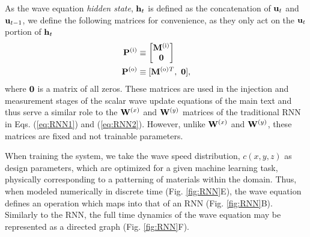 As the wave equation \textit{hidden state}, $\mathbf{h}_t$ is defined as the concatenation of $\mathbf{u}_t$ and $\mathbf{u}_{t-1}$, we define the following matrices for convenience, as they only act on the $\mathbf{u}_t$ portion of $\mathbf{h}_t$
\begin{align}
    \mathbf{P}^{(\textrm{i})} &\equiv \begin{bmatrix} \mathbf{M}^{(\textrm{i})} \\ \mathbf{0} \end{bmatrix} \\ 
    \mathbf{P}^{(\textrm{o})} &\equiv [\mathbf{M}^{(\textrm{o})}{}^T,~\mathbf{0}],
\end{align}
where $\mathbf{0}$ is a matrix of all zeros.
These matrices are used in the injection and measurement stages of the scalar wave update equations of the main text and thus serve a similar role to the $\mathbf{W}^{(x)}$ and $\mathbf{W}^{(y)}$ matrices of the traditional RNN in Eqs. (\ref{eq:RNN1}) and (\ref{eq:RNN2}).  However, unlike $\mathbf{W}^{(x)}$ and $\mathbf{W}^{(y)}$, these matrices are fixed and not trainable parameters.

When training the system, we take the wave speed distribution, $c{\left(x,y,z\right)}$ as design parameters, which are optimized for a given machine learning task, physically corresponding to a patterning of materials within the domain.
Thus, when modeled numerically in discrete time (Fig. \ref{fig:RNN}E), the wave equation defines an operation which maps into that of an RNN (Fig. \ref{fig:RNN}B).
Similarly to the RNN, the full time dynamics of the wave equation may be represented as a directed graph (Fig. \ref{fig:RNN}F).

